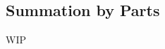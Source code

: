 \documentclass[../poma-notes.tex]{subfiles}
\begin{document}
\subsection*{Summation by Parts}

WIP
\end{document}
